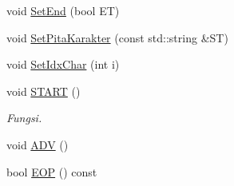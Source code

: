 \begin{DoxyCompactItemize}
void \hyperlink{classmesinkar_a9524ec9a172858d70cd4634522c209a3}{Set\-End} (bool E\-T)
\item 
void \hyperlink{classmesinkar_acee0c156b405890e71683621117e3d9a}{Set\-Pita\-Karakter} (const std\-::string \&S\-T)
\item 
void \hyperlink{classmesinkar_a30305750c7833ce3a17f7565093a2374}{Set\-Idx\-Char} (int i)
\item 
void \hyperlink{classmesinkar_a26a3a11395e4f34fb1d73f10af8ef2dd}{S\-T\-A\-R\-T} ()
\begin{DoxyCompactList}\small\item\em Fungsi. \end{DoxyCompactList}\item 
void \hyperlink{classmesinkar_a1a958d5650b913058f5e52694f8e8b22}{A\-D\-V} ()
\item 
bool \hyperlink{classmesinkar_ad767adfdba8d027504095b74d993747d}{E\-O\-P} () const 
\end{DoxyCompactItemize}


